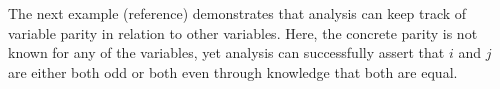 The next example (reference) demonstrates that analysis can keep track of variable parity in relation to other variables. Here, the concrete parity is not known for any of the variables, yet analysis can successfully assert that $i$ and $j$ are either both odd or both even through knowledge that both are equal.
